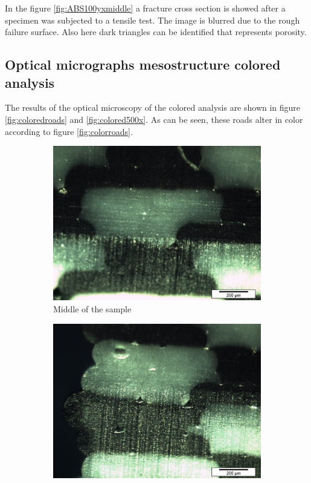 In the figure \ref{fig:ABS100yxmiddle} a fracture cross section is showed after a specimen was subjected to a tensile test. The image is blurred due to the rough failure surface. Also here dark triangles can be identified that represents porosity.

\subsection{Optical micrographs mesostructure colored analysis}

The results of the optical microscopy of the colored analysis are shown in figure \ref{fig:coloredroads} and \ref{fig:colored500x}. As can be seen, these roads alter in color according to figure \ref{fig:colorroads}. 
\begin{figure}
\centering
  \begin{subfigure}[b]{0.4\textwidth}
    \includegraphics[width=\textwidth]{chapter_4_RVE_Definition/figures/colored/Tv35_LI.jpg}
    \caption{Middle of the sample}
    \label{fig:1}
  \end{subfigure}
  \begin{subfigure}[b]{0.4\textwidth}
    \includegraphics[width=\textwidth]{chapter_4_RVE_Definition/figures/colored/Tv38_LI.jpg}

\end{subfigure}
\end{figure}
